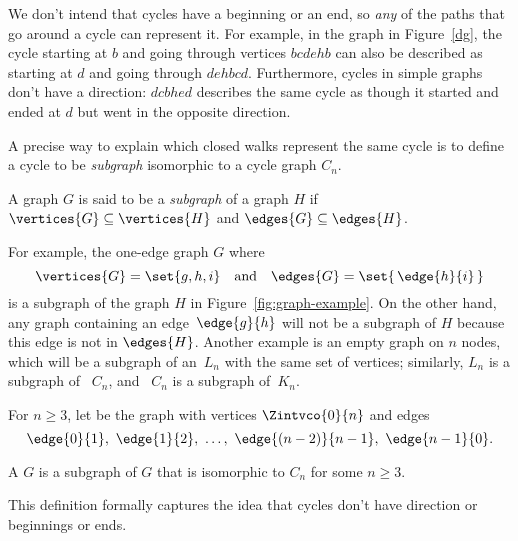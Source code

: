 We don't intend that cycles have a beginning or an end, so \emph{any}
of the paths that go around a cycle can represent it.  For example, in
the graph in Figure~\ref{dg}, the cycle starting at $b$ and going
through vertices $bcdehb$ can also be described as starting at $d$ and
going through $dehbcd$.  Furthermore, cycles in simple graphs don't
have a direction: $dcbhed$ describes the same cycle as though it
started and ended at $d$ but went in the opposite direction.

A precise way to explain which closed walks represent the same cycle
is to define a cycle to be \emph{subgraph} isomorphic to a cycle graph
$C_n$.

\begin{definition}\label{def:subgraph}
  A graph $G$ is said to be a \emph{subgraph} of a graph $H$ if
  $\vertices{G} \subseteq \vertices{H}$ and $\edges{G} \subseteq
  \edges{H}$.
\end{definition}

For example, the one-edge graph $G$ where
\begin{equation*}
   \vertices{G} = \set{ g, h, i } \quad \text{and}\quad  \edges{G} =
   \set{\, \edge{h}{i} \, }
\end{equation*}
is a subgraph of the graph $H$ in Figure~\ref{fig:graph-example}.  On the
other hand, any graph containing an edge~$\edge{g}{h}$ will not be a
subgraph of $H$ because this edge is not in $\edges{H}$.  Another example
is an empty graph on $n$ nodes, which will be a subgraph of an~$L_n$ with
the same set of vertices; similarly, $L_n$ is a subgraph of ~$C_n$, and ~$C_n$ is
a subgraph of~$K_n$.

\begin{definition}
  For $n \ge 3$, let  be the graph with vertices
  $\Zintvco{0}{n}$ and edges
\[
\edge{0}{1},\ \edge{1}{2},\ \dots,\  \edge{(n-2)}{n-1},\ \edge{n-1}{0}.
\]

\iffalse
A graph is a \term{cycle} of length $n$ iff it is isomorphic to $C_n$
for some $n \ge 3$.
\fi

A  $G$ is a subgraph of $G$ that is
isomorphic to $C_n$ for some $n \ge 3$.
\end{definition}

This definition formally captures the idea that cycles don't
have direction or beginnings or ends.

\begin{problems}
\practiceproblems
{}

\examproblems
{}

\end{problems}

